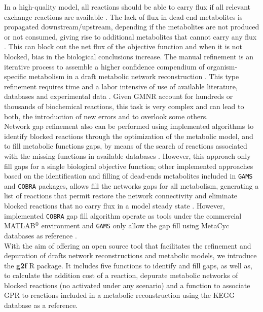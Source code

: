 In a high-quality model, all reactions should be able to carry flux if all relevant exchange reactions are available \cite{agren2013raven}. The lack of flux in dead-end metabolites is propagated downstream/upstream, depending if the metabolites are not produced or not consumed, giving rise to additional metabolites that cannot carry any flux  \cite{kumar2007optimization}. This can block out the net flux of the objective function and when it is not blocked, bias in the biological conclusions increase. The manual refinement is an iterative process to assemble a higher confidence compendium of organism-specific metabolism in a draft metabolic network reconstruction \cite{howe2008big,bateman2010curators,heavner2015transparency}. This type refinement requires time and a labor intensive of use of available literature, databases and experimental data \cite{heavner2015transparency, lakshmanan2012software}. Given GMNR account for hundreds or thousands of biochemical reactions, this task is very complex and can lead to both, the introduction of new errors and to overlook some others.\\

Network gap refinement also can be performed using implemented algorithms to identify blocked reactions through the optimization of the metabolic model, and to fill metabolic functions gaps, by means of the search of reactions associated with the missing functions in available databases \cite{agren2013raven, Thiele2014}. However, this approach only fill gaps for a single biological objective function; other implemented approaches based on the identification and filling of dead-ends metabolites included in \texttt{GAMS} \cite{kumar2007optimization} and \texttt{COBRA} \cite{schellenberger2011quantitative} packages, allows fill the networks gaps for all metabolism, generating a list of reactions that permit restore the network connectivity and eliminate blocked reactions that no carry flux in a model steady state \cite{heavner2015transparency}. However, implemented \texttt{COBRA} \cite{schellenberger2011quantitative} gap fill algorithm operate as tools under the commercial  MATLAB$^{\circledR}$ environment and \texttt{GAMS} \cite{kumar2007optimization} only allow the gap fill using MetaCyc databases as reference \cite{caspi2016metacyc}.\\

With the aim of offering an open source tool that facilitates the refinement and depuration of drafts network reconstructions and metabolic models, we introduce the \textbf{g2f} R package. It includes five functions to identify and fill gaps, as well as, to calculate the addition cost of a reaction, depurate metabolic networks of blocked reactions (no activated under any scenario) and a function to associate GPR to reactions included in a metabolic reconstruction using the KEGG database as a reference.
